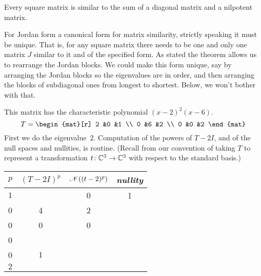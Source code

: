 \begin{corollary}
Every square matrix is similar to the sum of a diagonal matrix and a nilpotent
matrix.
\end{corollary}

For Jordan form a canonical form for 
matrix similarity,
strictly speaking it must be unique.
That is, for any square matrix there needs to be one and only one matrix $J$
similar to it and of the specified form.
As stated the theorem allows us to rearrange the Jordan blocks.
We could make this form unique, say 
by arranging the Jordan blocks so the eigenvalues are in 
order, and then arranging
the blocks of subdiagonal ones from 
longest to shortest.
Below, we won't bother with that.

\begin{example} \label{ex:FirstJordForm}
This matrix 
has the characteristic polynomial \( (x-2)^2(x-6) \).
\begin{equation*}
   T=
   \begin{mat}[r]
     2  &0  &1  \\
     0  &6  &2  \\
     0  &0  &2
   \end{mat}
\end{equation*}
First we do the eigenvalue~$2$.
Computation of the powers of $T-2I$, and of the null spaces and nullities, 
is routine.
(Recall from  our convention
of taking $T$ to represent a transformation $\mbox{$t\colon \mathbb{C}^3\to \mathbb{C}^3$}$
with respect to the standard basis.)
\begin{center}
  \renewcommand{\arraystretch}{1.25}
  \begin{tabular}{r|ccc} 
    \multicolumn{1}{c}{\( p \)}  
         &\( (T-2I)^p \) &\( \mathscr{N}((t-2)^p)  \) 
         &\textit{nullity}                                            \\  
    \hline
    \( 1 \)
    &\matrixvenlarge{\begin{mat}[r]
          0  &0  &1  \\
          0  &4  &2  \\
          0  &0  &0
        \end{mat}}
    &\( \set{\matrixvenlarge{\colvec{x \\ 0 \\ 0}}
         \suchthat x\in\C}  \)  
    &$1$                                                   \\
    \( 2 \)
    &\matrixvenlarge{\begin{mat}[r]

\end{mat}}
\end{tabular}
\end{center}
\end{example}
